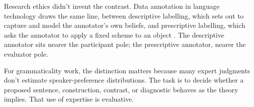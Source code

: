 Research ethics didn't invent the contrast. Data annotation in language technology draws the same line, between descriptive labelling, which sets out to capture and model the annotator's own beliefs, and prescriptive labelling, which asks the annotator to apply a fixed scheme to an object \citep{rottger2022annotation}. The descriptive annotator sits nearer the participant pole; the prescriptive annotator, nearer the evaluator pole.

For grammaticality work, the distinction matters because many expert judgments don't estimate speaker-preference distributions. The task is to decide whether a proposed sentence, construction, contrast, or diagnostic behaves as the theory implies. That use of expertise is evaluative.
